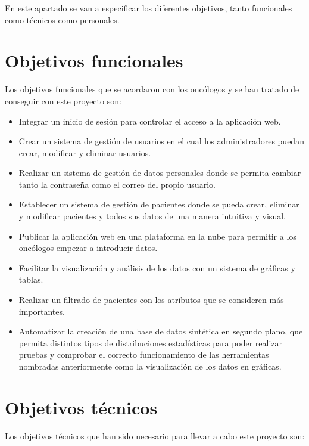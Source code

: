 
En este apartado se van a especificar los diferentes objetivos, tanto funcionales como técnicos como personales.

\section{Objetivos funcionales}

Los objetivos funcionales que se acordaron con los oncólogos y se han tratado de conseguir con este proyecto son:

\begin{itemize}
    \item Integrar un inicio de sesión para controlar el acceso a la aplicación web.
	\item Crear un sistema de gestión de usuarios en el cual los administradores puedan crear, modificar y eliminar usuarios.
	\item Realizar un sistema de gestión de datos personales donde se permita cambiar tanto la contraseña como el correo del propio usuario.
	\item Establecer un sistema de gestión de pacientes donde se pueda crear, eliminar y modificar pacientes y todos sus datos de una manera intuitiva y visual.
	\item Publicar la aplicación web en una plataforma en la nube para permitir a los oncólogos empezar a introducir datos.
	\item Facilitar la visualización y análisis de los datos con un sistema de gráficas y tablas.
	\item Realizar un filtrado de pacientes con los atributos que se consideren más importantes.
	\item Automatizar la creación de una base de datos sintética en segundo plano, que permita distintos tipos de distribuciones estadísticas para poder realizar pruebas y comprobar el correcto funcionamiento de las herramientas nombradas anteriormente como la visualización de los datos en gráficas.
\end{itemize}
\section{Objetivos técnicos}
Los objetivos técnicos que han sido necesario para llevar a cabo este proyecto son:

